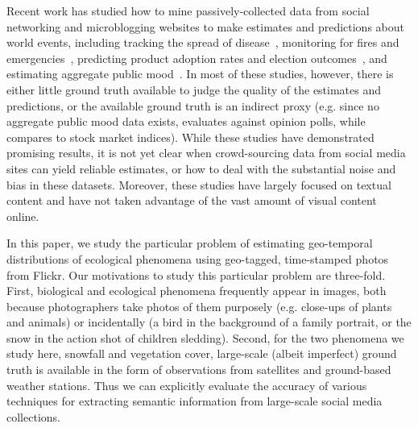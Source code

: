 \documentclass[10pt,journal,compsoc]{IEEEtran}
\begin{document}
Recent work has studied how to mine passively-collected data
from social networking and microblogging websites to make estimates
and predictions about world events, including tracking the spread of
disease~\cite{ginsberg09flu}, monitoring for fires and
emergencies~\cite{delongueville09}, predicting product adoption rates
and election outcomes~\cite{jin10prediction}, and estimating aggregate
public mood~\cite{oconnor10mood,bollen11twitter}. In most of these
studies, however, there is either little ground truth available to
judge the quality of the estimates and predictions, or the available
ground truth is an indirect proxy (e.g. since no aggregate public mood
data exists, \cite{oconnor10mood} evaluates against opinion polls,
while~\cite{bollen11twitter} compares to stock market indices).  While
these studies have demonstrated promising results, it is not yet clear
when crowd-sourcing data from social media sites can yield reliable
estimates, or how to deal with the substantial noise and bias in these
datasets. Moreover, these studies have largely focused on textual
content and have not taken advantage of the vast amount of visual
content online.

In this paper, we study the particular problem of estimating
geo-temporal distributions of ecological phenomena using geo-tagged,
time-stamped photos from Flickr.  Our motivations to study this
particular problem are three-fold.  First, biological and ecological
phenomena frequently appear in images, both because photographers take
photos of them purposely (e.g. close-ups of plants and animals) or
incidentally (a bird in the background of a family portrait, or the
snow in the action shot of children sledding).  Second, for the two
phenomena we study here, snowfall and vegetation cover, large-scale
(albeit imperfect) ground truth is available in the form of
observations from satellites and ground-based weather stations.  Thus
we can explicitly evaluate the accuracy of various techniques for
extracting semantic information from large-scale social media
collections.
\end{document}
